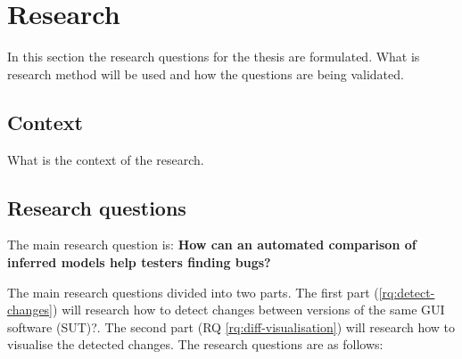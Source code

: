 \section{Research} \label{questions}
    In this section the research questions for the thesis are formulated. What is research method will be used and how the questions are being validated.

    \subsection{Context}
    What is the context of the research. 
    
    
    
\subsection{Research questions}
        
The main research question is: \textbf{How can an automated comparison of inferred models help testers finding bugs?}

The main research questions divided into two parts. The first part (\ref{rq:detect-changes}) will research how to detect changes between versions of the same GUI software (SUT)?\cite{testar-todo}. The second part (RQ \ref{rq:diff-visualisation}) will research how to visualise the detected changes. The research questions are as follows: 

